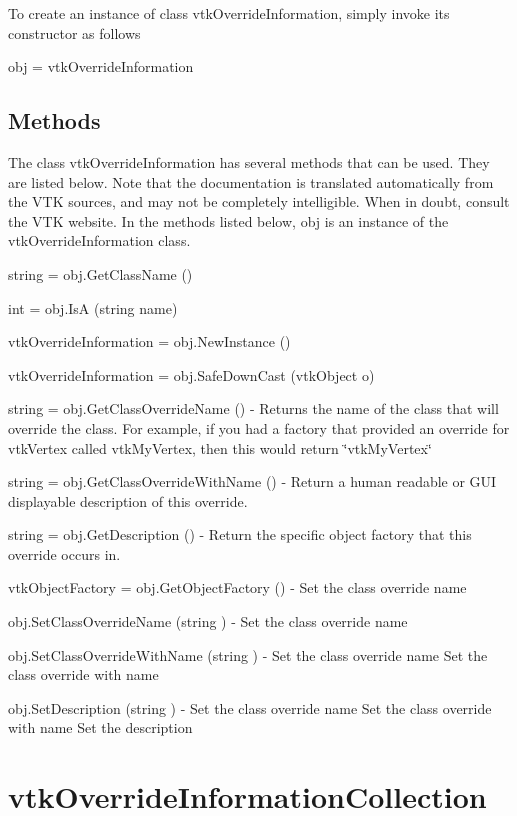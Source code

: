 To create an instance of class vtk\-Override\-Information, simply invoke its constructor as follows \begin{DoxyVerb}  obj = vtkOverrideInformation
\end{DoxyVerb}
 \hypertarget{vtkwidgets_vtkxyplotwidget_Methods}{}\subsection{Methods}\label{vtkwidgets_vtkxyplotwidget_Methods}
The class vtk\-Override\-Information has several methods that can be used. They are listed below. Note that the documentation is translated automatically from the V\-T\-K sources, and may not be completely intelligible. When in doubt, consult the V\-T\-K website. In the methods listed below, {\ttfamily obj} is an instance of the vtk\-Override\-Information class. 
\begin{DoxyItemize}
\item {\ttfamily string = obj.\-Get\-Class\-Name ()}  
\item {\ttfamily int = obj.\-Is\-A (string name)}  
\item {\ttfamily vtk\-Override\-Information = obj.\-New\-Instance ()}  
\item {\ttfamily vtk\-Override\-Information = obj.\-Safe\-Down\-Cast (vtk\-Object o)}  
\item {\ttfamily string = obj.\-Get\-Class\-Override\-Name ()} -\/ Returns the name of the class that will override the class. For example, if you had a factory that provided an override for vtk\-Vertex called vtk\-My\-Vertex, then this would return \char`\"{}vtk\-My\-Vertex\char`\"{}  
\item {\ttfamily string = obj.\-Get\-Class\-Override\-With\-Name ()} -\/ Return a human readable or G\-U\-I displayable description of this override.  
\item {\ttfamily string = obj.\-Get\-Description ()} -\/ Return the specific object factory that this override occurs in.  
\item {\ttfamily vtk\-Object\-Factory = obj.\-Get\-Object\-Factory ()} -\/ Set the class override name  
\item {\ttfamily obj.\-Set\-Class\-Override\-Name (string )} -\/ Set the class override name  
\item {\ttfamily obj.\-Set\-Class\-Override\-With\-Name (string )} -\/ Set the class override name Set the class override with name  
\item {\ttfamily obj.\-Set\-Description (string )} -\/ Set the class override name Set the class override with name Set the description  
\end{DoxyItemize}\hypertarget{vtkcommon_vtkoverrideinformationcollection}{}\section{vtk\-Override\-Information\-Collection}\label{vtkcommon_vtkoverrideinformationcollection}
